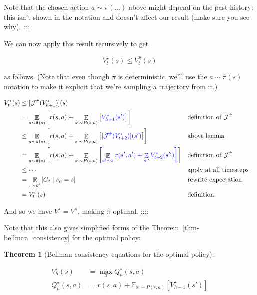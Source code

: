 \documentclass[
  letterpaper,
  DIV=11,
  numbers=noendperiod]{scrreprt}
\theoremstyle{plain}
\theoremstyle{plain}
\newtheorem{theorem}{Theorem}[chapter]
\theoremstyle{definition}
\theoremstyle{definition}
\theoremstyle{remark}
\begin{document}
Note that the chosen action \(a \sim \pi(\dots)\) above might depend on
the past history; this isn't shown in the notation and doesn't affect
our result (make sure you see why). :::

We can now apply this result recursively to get

\[V^{\star}_t(s) \le V^{\hat \pi}_t(s)\]

as follows. (Note that even though \(\hat \pi\) is deterministic, we'll
use the \(a \sim \hat \pi(s)\) notation to make it explicit that we're
sampling a trajectory from it.)

\[
\begin{aligned}
    V_{t}^{\star}(s) &\le [\mathcal{J}^{\hat \pi}(V_{h+1}^{\star})](s) \\
    &= \mathop{\mathbb{E}}_{a \sim \hat \pi(s)} \left[ r(s, a) + \mathop{\mathbb{E}}_{s' \sim P(s, a)} \left[ {\color{blue} V_{h+1}^{\star}(s')} \right] \right] && \text{definition of } \mathcal{J}^{\hat \pi} \\
    &\le \mathop{\mathbb{E}}_{a \sim \hat \pi(s)} \left[ r(s, a) + \mathop{\mathbb{E}}_{s' \sim P(s, a)} \left[ {\color{blue}[ \mathcal{J}^{\hat \pi} (V_{t+2}^{\star})] (s')} \right] \right] && \text{above lemma} \\
    &= \mathop{\mathbb{E}}_{a \sim \hat \pi(s)} \left[ r(s, a) + \mathop{\mathbb{E}}_{s' \sim P(s, a)}{\color{blue} \left[ \mathop{\mathbb{E}}_{a' \sim \hat \pi}  r(s', a') + \mathop{\mathbb{E}}_{s''} V_{t+2}^{\star}(s'') \right]} \right] && \text{definition of } \mathcal{J}^{\hat \pi} \\
    &\le \cdots && \text{apply at all timesteps} \\
    &= \mathop{\mathbb{E}}_{\tau \sim \rho^{\hat \pi}} [G_{t} \mid s_h= s] && \text{rewrite expectation} \\
    &= V_{t}^{\hat \pi}(s) && \text{definition}
\end{aligned}
\]

And so we have \(V^{\star} = V^{\hat \pi}\), making \(\hat \pi\)
optimal. ::::

Note that this also gives simplified forms of the
Theorem~\ref{thm-bellman_consistency} for the optimal policy:

\begin{theorem}[Bellman consistency equations for the optimal
policy]\protect\hypertarget{thm-bellman_consistency_optimal}{}\label{thm-bellman_consistency_optimal}

\[
\begin{aligned}
    V_h^\star(s) &= \max_a Q_h^\star(s, a) \\
    Q_h^\star(s, a) &= r(s, a) + \mathbb{E}_{s' \sim P(s, a)} [V_{h+1}^\star(s')]
\end{aligned}
\]

\end{theorem}
\end{document}
